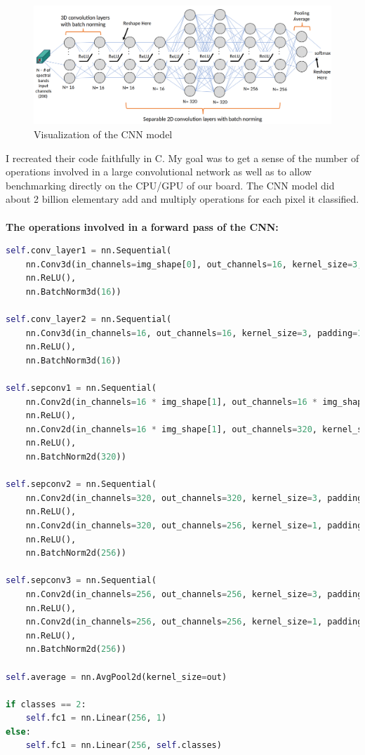\documentclass[psamsfonts]{amsart}
\newcommand{\mycomment}[1]{}
\theoremstyle{definition}
\theoremstyle{remark}
\numberwithin{equation}{section}
\begin{document}
\begin{figure}[H]
  \centering
  \includegraphics[scale=0.25]{cnn_arch.png}
  \caption{Visualization of the CNN model \cite{dirk-presentation}}
  \label{fig:cnn-struct}
\end{figure}

I recreated their code faithfully in C. My goal was to get a sense of the number of operations involved in a large convolutional network as well as to allow benchmarking directly on the CPU/GPU of our board. \mycomment{It should be noted that this program naturally ran very slowly compared to the Python code due to the lack of optimizations that pytorch implements such as GPU acceleration, parallelism, memory optimization, operator fusion, and more.}The CNN model did about 2 billion elementary add and multiply operations for each pixel it classified.\\\\
\textbf{The operations involved in a forward pass of the CNN:}
\begin{lstlisting}[language=python]
self.conv_layer1 = nn.Sequential(
    nn.Conv3d(in_channels=img_shape[0], out_channels=16, kernel_size=3, padding=1),
    nn.ReLU(),
    nn.BatchNorm3d(16))

self.conv_layer2 = nn.Sequential(
    nn.Conv3d(in_channels=16, out_channels=16, kernel_size=3, padding=1),
    nn.ReLU(),
    nn.BatchNorm3d(16))

self.sepconv1 = nn.Sequential(
    nn.Conv2d(in_channels=16 * img_shape[1], out_channels=16 * img_shape[1], kernel_size=5, padding=2, groups=16 * img_shape[1]),
    nn.ReLU(),
    nn.Conv2d(in_channels=16 * img_shape[1], out_channels=320, kernel_size=1, padding=0),
    nn.ReLU(),
    nn.BatchNorm2d(320))

self.sepconv2 = nn.Sequential(
    nn.Conv2d(in_channels=320, out_channels=320, kernel_size=3, padding=1, stride=stride, groups=320),
    nn.ReLU(),
    nn.Conv2d(in_channels=320, out_channels=256, kernel_size=1, padding=0),
    nn.ReLU(),
    nn.BatchNorm2d(256))

self.sepconv3 = nn.Sequential(
    nn.Conv2d(in_channels=256, out_channels=256, kernel_size=3, padding=1, stride=stride, groups=256),
    nn.ReLU(),
    nn.Conv2d(in_channels=256, out_channels=256, kernel_size=1, padding=0),
    nn.ReLU(),
    nn.BatchNorm2d(256))

self.average = nn.AvgPool2d(kernel_size=out)

if classes == 2:
    self.fc1 = nn.Linear(256, 1)
else:
    self.fc1 = nn.Linear(256, self.classes)
\end{lstlisting}
\end{document}
